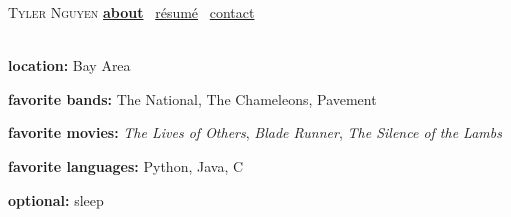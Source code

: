 \documentclass{article}
\begin{document}
\begin{preview}
\noindent \textsc{\Huge Tyler Nguyen} {\large \quad \href{about.pdf}{\textbf{\textbullet about}} \ \href{resume.pdf}{r\'esum\'e} \ \href{contact.pdf}{contact}}

\noindent\dotfill\\

\textbf{location:} Bay Area

\textbf{favorite bands:} The National, The Chameleons, Pavement

\textbf{favorite movies:} \textit{The Lives of Others}, \textit{Blade Runner}, \textit{The Silence of the Lambs}

\textbf{favorite languages:} Python, Java, C

\textbf{optional:} sleep
\end{preview}
\end{document}
